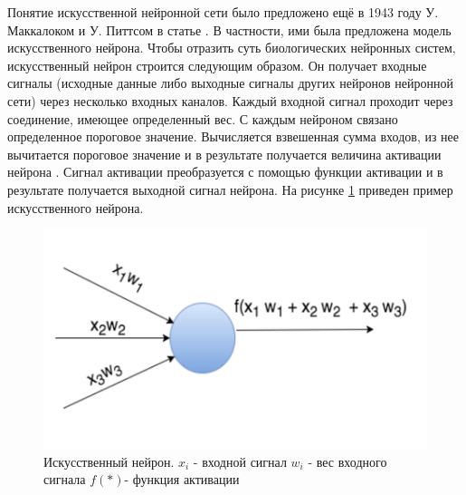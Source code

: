 Понятие искусственной нейронной сети было предложено ещё в 1943 году У. Маккалоком и У. Питтсом в статье \cite{neural_nets}. В частности, ими была предложена модель искусственного нейрона.
Чтобы отразить суть биологических нейронных систем, искусственный нейрон строится следующим образом. Он получает входные сигналы (исходные данные либо выходные сигналы других нейронов нейронной сети) через несколько входных каналов. Каждый входной сигнал проходит через соединение, имеющее определенный вес. С каждым нейроном связано определенное пороговое значение. Вычисляется взвешенная сумма входов, из нее вычитается пороговое значение и в результате получается величина активации нейрона . Сигнал активации преобразуется с помощью функции активации и в результате получается выходной сигнал нейрона.
На рисунке \ref{fig:neuron} приведен пример искусственного нейрона.

\begin{figure}[ht]
    \centering
    \includegraphics [width=\textwidth*2/3] {images/neuron.png}
    \caption{Искусственный нейрон. $x_i$ - входной сигнал
$w_i$ - вес входного сигнала $f(*)$- функция активации}
    \label{fig:neuron}
\end{figure}


